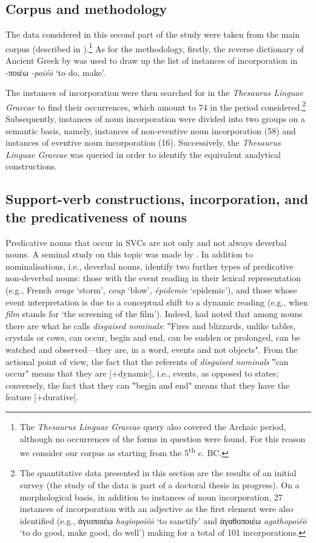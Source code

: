 \documentclass[output=paper,colorlinks,citecolor=brown]{langscibook}
\begin{document}
\subsection{Corpus and methodology}\label{Section3/1}
The data considered in this second part of the study were taken from the main corpus (described in ).\footnote{The \textit{Thesaurus Linguae Graecae} query also covered the Archaic period, although no occurrences of the forms in question were found. For this reason we consider our corpus as starting from the 5\textsuperscript{th} c. BC.} As for the methodology, firstly, the reverse dictionary of Ancient Greek by \citet{KretschmerLocker1977} was used to draw up the list of instances of incorporation in -ποιέω \textit{-poiéō} `to do, make'.


The instances of incorporation were then searched for in the \textit{Thesaurus Linguae Graecae} to find their occurrences, which amount to 74 in the period considered.\footnote{The quantitative data presented in this section are the results of an initial survey (the study of the data is part of a doctoral thesis in progress). On a morphological basis, in addition to instances of noun incorporation, 27 instances of incorporation with an adjective as the first element were also identified (e.g., ἁγιοποιέω \textit{hagiopoiéō} `to sanctify' and ἀγαθοποιέω \textit{agathopoiéō} `to do good, make good, do well') making for a total of 101 incorporations.} Subsequently, instances of noun incorporation were divided into two groups on a semantic basis, namely, instances of non-eventive noun incorporation (58) and instances of eventive noun incorporation (16). Successively, the \textit{Thesaurus Linguae Graecae} was queried in order to identify the equivalent analytical constructions.

\subsection{Support-verb constructions, incorporation, and the predicativeness of nouns}\label{Section3/2}
Predicative nouns that occur in SVCs are not only and not always deverbal nouns. A seminal study on this topic was made by \citet{GrossKiefer1995}. In addition to nominalisations, i.e., deverbal nouns, \citeauthor{GrossKiefer1995} identify two further types of predicative non-deverbal nouns: those with the event reading in their lexical representation (e.g., French \textit{orage} `storm', \textit{coup} `blow', \textit{épidemie} `epidemic'), and those whose event interpretation is due to a conceptual shift to a dynamic reading (e.g., when \textit{film} stands for `the screening of the film'). Indeed, \citet[141]{Vendler1967} had noted that among nouns there are what he calls \textit{disguised nominals}: ‟Fires and blizzards, unlike tables, crystals or cows, can occur, begin and end, can be sudden or prolonged, can be watched and observed---they are, in a word, events and not objects". From the actional point of view, the fact that the referents of \textit{disguised nominals} ‟can occur" means that they are [+dynamic], i.e., events, as opposed to states; conversely, the fact that they can ‟begin and end" means that they have the feature [+durative]. 
 
\end{document}
